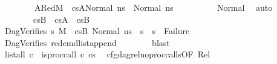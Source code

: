 \begin{isabellebody}
\ \ \ \ \ \ \ \ A{}Red{}{\isacharcolon}{\kern0pt}{\isachardoublequoteopen}M{\isacharcomma}{\kern0pt}{\isasymLambda}{\isacharcomma}{\kern0pt}{\isasymGamma}{\isacharcomma}{\kern0pt}{\isasymOmega}\ {\isasymturnstile}\ {\isasymlangle}cs{}A{\isacharprime}{\kern0pt}{\isacharprime}{\kern0pt}{\isacharcomma}{\kern0pt}Normal\ ns{}{\isacharprime}{\kern0pt}{\isasymrangle}\ {\isacharbrackleft}{\kern0pt}{\isasymrightarrow}{\isacharbrackright}{\kern0pt}\ Normal\ ns{}{\isacharprime}{\kern0pt}{\isacharprime}{\kern0pt}{\isachardoublequoteclose}\isanewline
\ \ \ \ \ \ \ \ \isamarkupfalse%
\ Normal{}\ \isamarkupfalse%
\ auto\isanewline
\ \ \isanewline
\ \ \ \ \ \ \isamarkupfalse%
\ {\isacartoucheopen}cs{}B{\isacharprime}{\kern0pt}\ {\isacharequal}{\kern0pt}\ cs{}A{\isacharprime}{\kern0pt}{\isacharprime}{\kern0pt}\ {\isacharat}{\kern0pt}\ cs{}B{\isacharprime}{\kern0pt}{\isacharprime}{\kern0pt}{\isacartoucheclose}\isanewline
\ \ \ \ \ \ \isamarkupfalse%
\ DagVerifies{}{\isacharcolon}{\kern0pt}\ {\isachardoublequoteopen}{\isasymAnd}s{}{\isacharprime}{\kern0pt}{\isachardot}{\kern0pt}\ M{\isacharcomma}{\kern0pt}{\isasymLambda}{\isacharcomma}{\kern0pt}{\isasymGamma}{\isacharcomma}{\kern0pt}{\isasymOmega}\ {\isasymturnstile}\ {\isasymlangle}cs{}B{\isacharprime}{\kern0pt}{\isacharprime}{\kern0pt}{\isacharcomma}{\kern0pt}\ Normal\ ns{}{\isacharprime}{\kern0pt}{\isacharprime}{\kern0pt}{\isasymrangle}\ {\isacharbrackleft}{\kern0pt}{\isasymrightarrow}{\isacharbrackright}{\kern0pt}\ s{}{\isacharprime}{\kern0pt}\ {\isasymLongrightarrow}\ s{}{\isacharprime}{\kern0pt}\ {\isasymnoteq}\ Failure{\isachardoublequoteclose}\isanewline
\ \ \ \ \ \ \isamarkupfalse%
\ DagVerifies{}\ red{\isacharunderscore}{\kern0pt}cmd{\isacharunderscore}{\kern0pt}list{\isacharunderscore}{\kern0pt}append\isanewline
\ \ \ \ \ \ \isamarkupfalse%
\ blast\isanewline
\ \ \isanewline
\ \ \ \ \ \ \isamarkupfalse%
\ {\isachardoublequoteopen}list{\isacharunderscore}{\kern0pt}all\ {\isacharparenleft}{\kern0pt}{\isasymlambda}c{\isachardot}{\kern0pt}\ {\isasymnot}\ is{\isacharunderscore}{\kern0pt}proc{\isacharunderscore}{\kern0pt}call\ c{\isacharparenright}{\kern0pt}\ cs{}{\isachardoublequoteclose}\ \isamarkupfalse%
\ cfg{\isacharunderscore}{\kern0pt}dag{\isacharunderscore}{\kern0pt}rel{\isacharunderscore}{\kern0pt}no{\isacharunderscore}{\kern0pt}proc{\isacharunderscore}{\kern0pt}calls{\isacharbrackleft}{\kern0pt}OF\ Rel{\isacharbrackright}{\kern0pt}\ \isamarkupfalse%

\end{isabellebody}
